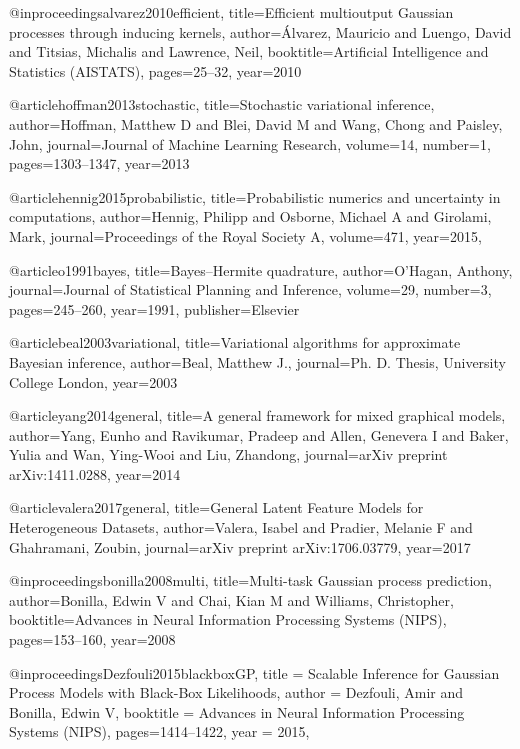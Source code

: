 \documentclass[]{article}
\begin{document}
@inproceedings{alvarez2010efficient,
	title={Efficient multioutput {G}aussian processes through 
	 inducing kernels},
	author={{\'A}lvarez, Mauricio and Luengo, David and Titsias, Michalis and Lawrence, Neil},
	booktitle={Artificial Intelligence and Statistics (AISTATS)},
	pages={25--32},
	year={2010}
}

@article{hoffman2013stochastic,
	title={Stochastic variational inference},
	author={Hoffman, Matthew D and Blei, David M and Wang, Chong and Paisley, John},
	journal={Journal of Machine Learning Research},
	volume={14},
	number={1},
	pages={1303--1347},
	year={2013}
}

@article{hennig2015probabilistic,
	title={Probabilistic numerics and uncertainty in computations},
	author={Hennig, Philipp and Osborne, Michael A and Girolami, Mark},
	journal={Proceedings of the Royal Society A},
	volume={471},
	year={2015},
}

@article{o1991bayes,
	title={Bayes--{H}ermite quadrature},
	author={O'Hagan, Anthony},
	journal={Journal of Statistical Planning and Inference},
	volume={29},
	number={3},
	pages={245--260},
	year={1991},
	publisher={Elsevier}
}

@article{beal2003variational,
	title={Variational algorithms for approximate {B}ayesian inference},
	author={Beal, Matthew J.},
	journal={Ph. D. Thesis, University College London},
	year={2003}
}

@article{yang2014general,
	title={A general framework for mixed graphical models},
	author={Yang, Eunho and Ravikumar, Pradeep and Allen, Genevera I and Baker, Yulia and Wan, Ying-Wooi and Liu, Zhandong},
	journal={arXiv preprint arXiv:1411.0288},
	year={2014}
}

@article{valera2017general,
	title={General Latent Feature Models for Heterogeneous Datasets},
	author={Valera, Isabel and Pradier, Melanie F and Ghahramani, Zoubin},
	journal={arXiv preprint arXiv:1706.03779},
	year={2017}
}

@inproceedings{bonilla2008multi,
	title={Multi-task {G}aussian process prediction},
	author={Bonilla, Edwin V and Chai, Kian M and Williams, Christopher},
	booktitle={Advances in Neural Information Processing Systems (NIPS)},
	pages={153--160},
	year={2008}
}

@inproceedings{Dezfouli2015blackboxGP,
title = {Scalable Inference for {G}aussian Process Models with Black-Box Likelihoods},
author = {Dezfouli, Amir and Bonilla, Edwin V},
booktitle = {Advances in Neural Information Processing Systems (NIPS)},
pages={1414--1422},
year = {2015},
}
\end{document}
